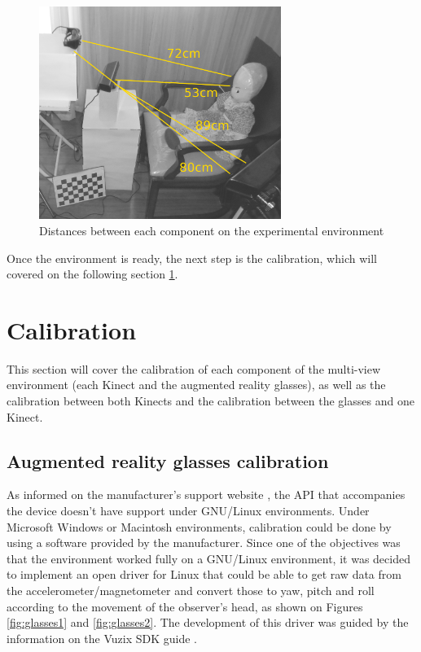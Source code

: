 \documentclass[msc, a4paper, classic, en]{ufbathesis}
\begin{document}
\begin{figure}
\centering
\includegraphics[width=0.7\textwidth]{images/expenv3.png}
\caption{Distances between each component on the experimental environment}
\label{fig:expenv3}
\end{figure}

Once the environment is ready, the next step is the calibration, which will covered on the following section \ref{sec:calibration}.

\section{Calibration}
\label{sec:calibration}

This section will cover the calibration of each component of the multi-view environment (each Kinect and the augmented reality glasses), as well as the calibration between both Kinects and the calibration between the glasses and one Kinect.

\subsection{Augmented reality glasses calibration}
\label{sec:glasses}

As informed on the manufacturer's support website \cite{vuzixsupport}, the API that accompanies the device doesn't have support under GNU/Linux environments. Under Microsoft Windows or Macintosh environments, calibration could be done by using a software provided by the manufacturer. Since one of the objectives was that the environment worked fully on a GNU/Linux environment, it was decided to implement an open driver for Linux that could be able to get raw data from the accelerometer/magnetometer and convert those to yaw, pitch and roll according to the movement of the observer's head, as shown on Figures \ref{fig:glasses1} and \ref{fig:glasses2}. The development of this driver was guided by the information on the Vuzix SDK guide \cite{vuzixsdk}.
\end{document}
